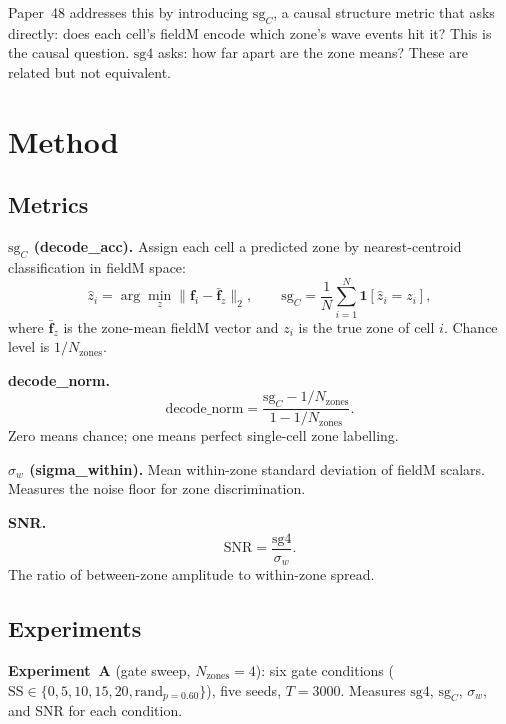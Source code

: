 \documentclass[11pt,a4paper]{article}
\begin{document}
Paper~48 addresses this by introducing $\mathrm{sg}_C$, a causal structure
metric that asks directly: does each cell's fieldM encode which zone's wave
events hit it?  This is the causal question.  $\mathrm{sg4}$ asks: how far
apart are the zone means?  These are related but not equivalent.

\section{Method}

\subsection{Metrics}

\textbf{$\mathrm{sg}_C$ (decode\_acc).}  Assign each cell a predicted zone
by nearest-centroid classification in fieldM space:
\begin{equation}
  \hat{z}_i = \arg\min_{z} \|\mathbf{f}_i - \bar{\mathbf{f}}_z\|_2,
  \qquad
  \mathrm{sg}_C = \frac{1}{N}\sum_{i=1}^N \mathbf{1}[\hat{z}_i = z_i],
\end{equation}
where $\bar{\mathbf{f}}_z$ is the zone-mean fieldM vector and $z_i$ is the true
zone of cell $i$.  Chance level is $1/N_\text{zones}$.

\textbf{decode\_norm.}
\begin{equation}
  \text{decode\_norm} = \frac{\mathrm{sg}_C - 1/N_\text{zones}}{1 - 1/N_\text{zones}}.
\end{equation}
Zero means chance; one means perfect single-cell zone labelling.

\textbf{$\sigma_w$ (sigma\_within).}  Mean within-zone standard deviation of
fieldM scalars.  Measures the noise floor for zone discrimination.

\textbf{SNR.}
\begin{equation}
  \mathrm{SNR} = \frac{\mathrm{sg4}}{\sigma_w}.
\end{equation}
The ratio of between-zone amplitude to within-zone spread.

\subsection{Experiments}

\textbf{Experiment~A} (gate sweep, $N_\text{zones}=4$): six gate conditions
($\mathrm{SS} \in \{0,5,10,15,20,\text{rand}_{p=0.60}\}$), five seeds, $T=3000$.
Measures $\mathrm{sg4}$, $\mathrm{sg}_C$, $\sigma_w$, and SNR for each condition.
\end{document}
